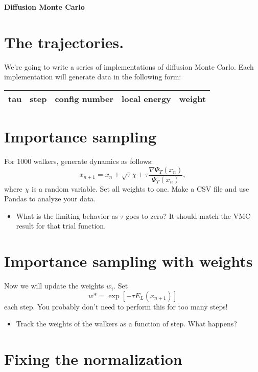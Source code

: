 \documentclass[12pt]{article}
\begin{document}
	{\bf Diffusion Monte Carlo } 

\section*{The trajectories.} 

We're going to write a series of implementations of diffusion Monte Carlo.
Each implementation will generate data in the following form: 

\begin{tabular}{ccccc}
tau&step&config number&	local energy&weight\\
\hline
\end{tabular}


	
\section{Importance sampling} 

For 1000 walkers, generate dynamics as follows: 
\begin{equation}
x_{n+1} = x_n + \sqrt{\tau}\chi + \tau \frac{\nabla \Psi_T(x_n)}{\Psi_T(x_n)},
\end{equation}
where $\chi$ is a random variable. 
Set all weights to one.
Make a CSV file and use Pandas to analyze your data. 

\begin{itemize}
\item What is the limiting behavior as $\tau$ goes to zero? It should match the VMC result for that trial function.	
\end{itemize}

\section{Importance sampling with weights}
Now we will update the weights $w_i$. Set 
\begin{equation}
w*=	\exp[-\tau E_L(x_{n+1})] 
\end{equation}
each step.
You probably don't need to perform this for too many steps!

\begin{itemize}
\item Track the weights of the walkers as a function of step. What happens?
\end{itemize}

\section{Fixing the normalization}
\end{document}
